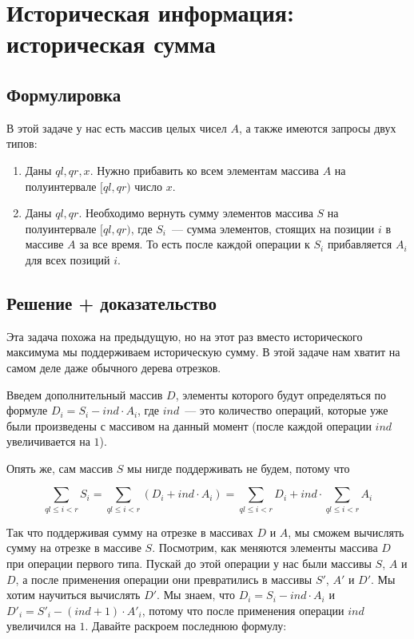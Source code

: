 \cprotect \section{Историческая информация: историческая сумма}

\subsection{Формулировка}

В этой задаче у нас есть массив целых чисел $A$, а также имеются запросы двух типов:

\begin{enumerate}
    \item Даны $ql, qr, x$. Нужно прибавить ко всем элементам массива $A$ на полуинтервале $[ql, qr)$ число $x$.
    \item Даны $ql, qr$. Необходимо вернуть сумму элементов массива $S$ на полуинтервале $[ql, qr)$, где $S_i$~--- сумма элементов, стоящих на позиции $i$ в массиве $A$ за все время. То есть после каждой операции к $S_i$ прибавляется $A_i$ для всех позиций $i$.
\end{enumerate}

\subsection{Решение + доказательство}

Эта задача похожа на предыдущую, но на этот раз вместо исторического максимума мы поддерживаем историческую сумму. В этой задаче нам хватит на самом деле даже обычного дерева отрезков.

Введем дополнительный массив $D$, элементы которого будут определяться по формуле $D_i = S_i - ind \cdot A_i$, где $ind$~--- это количество операций, которые уже были произведены с массивом на данный момент (после каждой операции $ind$ увеличивается на $1$).

Опять же, сам массив $S$ мы нигде поддерживать не будем, потому что

$$
\sum_{ql \le i < r} S_i = \sum_{ql \le i < r} \left(D_i + ind \cdot A_i\right) = \sum_{ql \le i < r} D_i + ind \cdot \sum_{ql \le i < r} A_i
$$

Так что поддерживая сумму на отрезке в массивах $D$ и $A$, мы сможем вычислять сумму на отрезке в массиве $S$.
Посмотрим, как меняются элементы массива $D$ при операции первого типа.
Пускай до этой операции у нас были массивы $S$, $A$ и $D$, а после применения операции они превратились в массивы $S'$, $A'$ и $D'$.
Мы хотим научиться вычислять $D'$. Мы знаем, что $D_i = S_i - ind \cdot A_i$ и $D'_i = S'_i - (ind + 1) \cdot A'_i$, потому что после применения операции $ind$ увеличился на $1$. Давайте раскроем последнюю формулу:

